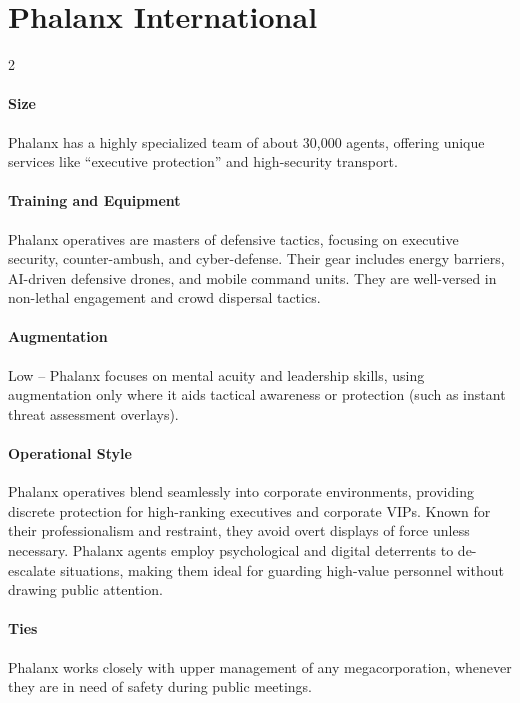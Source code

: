 \section*{Phalanx International}
\vspace{5mm}
\begin{multicols}{2}
\paragraph{Size}
Phalanx has a highly specialized team of about 30,000 agents, offering unique services like “executive protection” and high-security transport.
\paragraph{Training and Equipment}
Phalanx operatives are masters of defensive tactics, focusing on executive security, counter-ambush, and cyber-defense. Their gear includes energy barriers, AI-driven defensive drones, and mobile command units. They are well-versed in non-lethal engagement and crowd dispersal tactics.
\paragraph{Augmentation}
Low – Phalanx focuses on mental acuity and leadership skills, using augmentation only where it aids tactical awareness or protection (such as instant threat assessment overlays).
\paragraph{Operational Style}
Phalanx operatives blend seamlessly into corporate environments, providing discrete protection for high-ranking executives and corporate VIPs. Known for their professionalism and restraint, they avoid overt displays of force unless necessary. Phalanx agents employ psychological and digital deterrents to de-escalate situations, making them ideal for guarding high-value personnel without drawing public attention.
\paragraph{Ties}
Phalanx works closely with upper management of any megacorporation, whenever they are in need of safety during public meetings.
\end{multicols}
